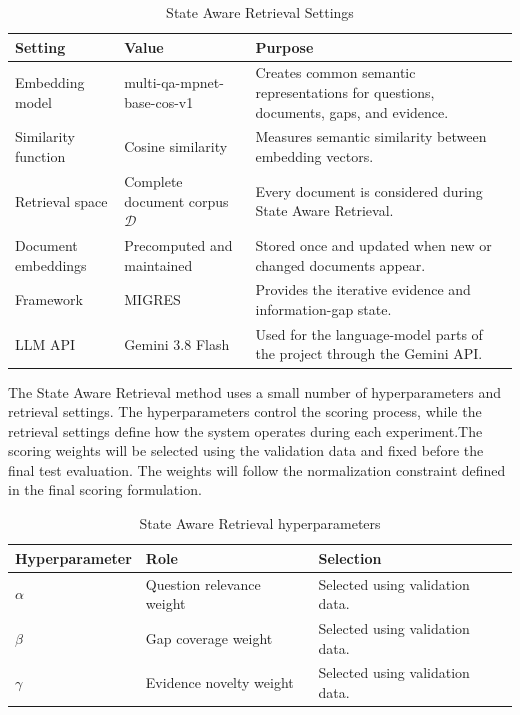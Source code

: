 \documentclass[12pt,a4paper]{report}
\begin{document}
\begin{table}[H]
\centering
\caption{State Aware Retrieval Settings}
\label{tab:sar-settings-initial}
\renewcommand{\arraystretch}{1.2}
\begin{tabular}{|p{1.75in}|p{1.35in}|p{3.0in}|}
\hline
\textbf{Setting} & \textbf{Value} & \textbf{Purpose} \\ \hline
Embedding model & multi-qa-mpnet-base-cos-v1 & Creates common semantic representations for questions, documents, gaps, and evidence. \\ \hline
Similarity function & Cosine similarity & Measures semantic similarity between embedding vectors. \\ \hline
Retrieval space & Complete document corpus $\mathcal{D}$ & Every document is considered during State Aware Retrieval. \\ \hline
Document embeddings & Precomputed and maintained & Stored once and updated when new or changed documents appear. \\ \hline
Framework & MIGRES & Provides the iterative evidence and information-gap state. \\ \hline
LLM API & Gemini 3.8 Flash & Used for the language-model parts of the project through the Gemini API. \\ \hline
\end{tabular}
\end{table}

The State Aware Retrieval method uses a small number of hyperparameters and retrieval settings. The hyperparameters control the scoring process, while the retrieval settings define how the system operates during each experiment.The scoring weights will be selected using the validation data and fixed before the final test evaluation. The weights will follow the normalization constraint defined in the final scoring formulation.

\begin{table}[H]
\centering
\caption{State Aware Retrieval hyperparameters}
\label{tab:sar-hyperparameters-initial}
\renewcommand{\arraystretch}{1.2}
\begin{tabular}{|p{1.45in}|p{1.75in}|p{2.9in}|}
\hline
\textbf{Hyperparameter} & \textbf{Role} & \textbf{Selection} \\ \hline
$\alpha$ & Question relevance weight & Selected using validation data. \\ \hline
$\beta$ & Gap coverage weight & Selected using validation data. \\ \hline
$\gamma$ & Evidence novelty weight & Selected using validation data. \\ \hline
\end{tabular}
\end{table}
\end{document}
